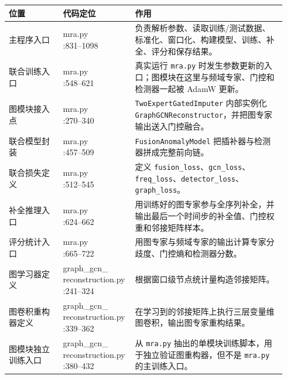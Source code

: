 \documentclass[UTF8]{ctexart}
\newcommand{\codecell}[1]{\parbox[t]{\linewidth}{\raggedright\ttfamily\small #1}}
\begin{document}
{\small
\begin{longtable}{@{}>{\raggedright\arraybackslash}p{0.19\linewidth} >{\raggedright\arraybackslash}p{0.22\linewidth} >{\raggedright\arraybackslash}p{0.53\linewidth}@{}}
\toprule
位置 & 代码定位 & 作用 \\
\midrule
\endhead
主程序入口 & \codecell{mra.py\\:831--1098} & 负责解析参数、读取训练/测试数据、标准化、窗口化、构建模型、训练、补全、评分和保存结果。 \\
联合训练入口 & \codecell{mra.py\\:548--621} & 真实运行 \verb|mra.py| 时发生参数更新的入口；图模块在这里与频域专家、门控和检测器一起被 AdamW 更新。 \\
图模块接入点 & \codecell{mra.py\\:270--340} & \verb|TwoExpertGatedImputer| 内部实例化 \verb|GraphGCNReconstructor|，并把图专家输出送入门控融合。 \\
联合模型封装 & \codecell{mra.py\\:457--509} & \verb|FusionAnomalyModel| 把插补器与检测器拼成完整前向链。 \\
联合损失定义 & \codecell{mra.py\\:512--545} & 定义 \verb|fusion_loss|、\verb|gcn_loss|、\verb|freq_loss|、\verb|detector_loss|、\verb|graph_loss|。 \\
补全推理入口 & \codecell{mra.py\\:624--662} & 用训练好的图专家参与全序列补全，并输出最后一个时间步的补全值、门控权重和邻接矩阵样本。 \\
评分统计入口 & \codecell{mra.py\\:665--722} & 用图专家与频域专家的输出计算专家分歧度、门控熵和检测器分数。 \\
图学习器定义 & \codecell{graph\_gcn\_\\reconstruction.py\\:241--324} & 根据窗口级节点统计量构造邻接矩阵。 \\
图卷积重构器定义 & \codecell{graph\_gcn\_\\reconstruction.py\\:339--362} & 在学习到的邻接矩阵上执行三层变量维图卷积，输出图专家重构结果。 \\
图模块独立训练入口 & \codecell{graph\_gcn\_\\reconstruction.py\\:380--432} & 从 \verb|mra.py| 抽出的单模块训练脚本，用于独立验证图重构器，但不是 \verb|mra.py| 的主训练入口。 \\
\bottomrule
\end{longtable}
}
\end{document}
